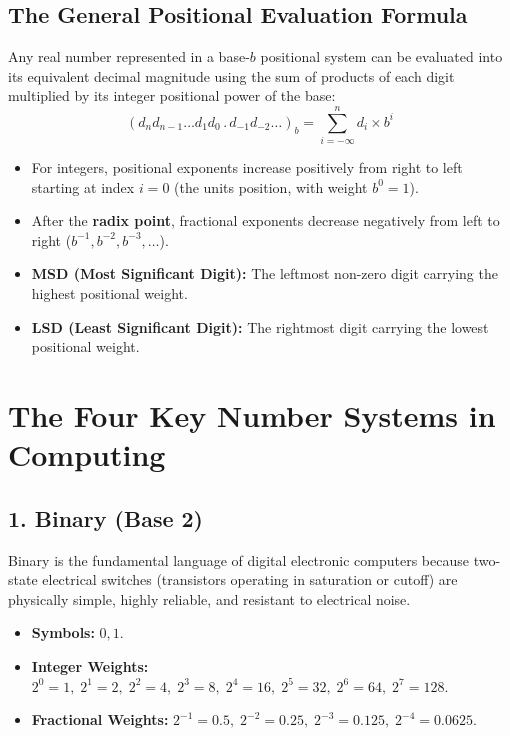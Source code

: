 \subsection{The General Positional Evaluation Formula}
Any real number represented in a base-$b$ positional system can be evaluated into its equivalent decimal magnitude using the sum of products of each digit multiplied by its integer positional power of the base:
\begin{equation}
(d_n d_{n-1} \dots d_1 d_0 \,.\, d_{-1} d_{-2} \dots)_b = \sum_{i=-\infty}^{n} d_i \times b^i
\end{equation}
\begin{itemize}[leftmargin=1.2em]
    \item For integers, positional exponents increase positively from right to left starting at index $i = 0$ (the units position, with weight $b^0 = 1$).
    \item After the \textbf{radix point}, fractional exponents decrease negatively from left to right ($b^{-1}, b^{-2}, b^{-3}, \dots$).
    \item \textbf{MSD (Most Significant Digit):} The leftmost non-zero digit carrying the highest positional weight.
    \item \textbf{LSD (Least Significant Digit):} The rightmost digit carrying the lowest positional weight.
\end{itemize}

\section{The Four Key Number Systems in Computing}

\subsection{1. Binary (Base 2)}
Binary is the fundamental language of digital electronic computers because two-state electrical switches (transistors operating in saturation or cutoff) are physically simple, highly reliable, and resistant to electrical noise.
\begin{itemize}[leftmargin=1.2em]
    \item \textbf{Symbols:} $0, 1$.
    \item \textbf{Integer Weights:} $2^0 = 1, \; 2^1 = 2, \; 2^2 = 4, \; 2^3 = 8, \; 2^4 = 16, \; 2^5 = 32, \; 2^6 = 64, \; 2^7 = 128$.
    \item \textbf{Fractional Weights:} $2^{-1} = 0.5, \; 2^{-2} = 0.25, \; 2^{-3} = 0.125, \; 2^{-4} = 0.0625$.
\end{itemize}

